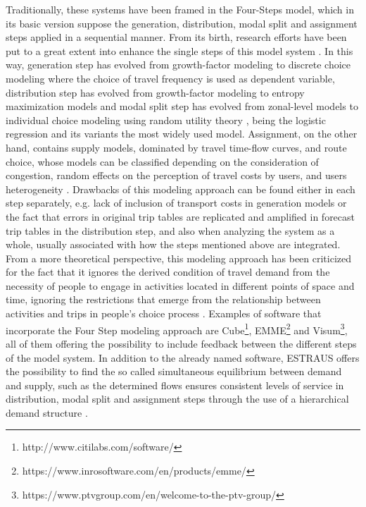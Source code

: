 \documentclass[Journal,letterpaper]{ascelike-new}
\begin{document}
Traditionally, these systems have been framed in the Four-Steps model, which in its basic version suppose the generation, distribution, modal split and assignment steps applied in a sequential manner. From its birth, research efforts have been put to a great extent into enhance the single steps of this model system \citep{Boyce2007}. In this way, generation step has evolved from growth-factor modeling to discrete choice modeling where the choice of travel frequency is used as dependent variable, distribution step has evolved from growth-factor modeling to entropy maximization models and modal split step has evolved from zonal-level models to individual choice modeling using random utility theory \citep{OrtuzarWillumsen2011}, being the logistic regression and its variants the most widely used model. Assignment, on the other hand, contains supply models, dominated by travel time-flow curves, and route choice, whose models can be classified depending on the consideration of congestion, random effects on the perception of travel costs by users, and users heterogeneity \citep{WillumsenHensherButton2008}. Drawbacks of this modeling approach can be found either in each step separately, e.g. lack of inclusion of transport costs in generation models or the fact that errors in original trip tables are replicated and amplified in forecast trip tables in the distribution step, and also when analyzing the system as a whole, usually associated with how the steps mentioned above are integrated. From a more theoretical perspective, this modeling approach has been criticized for the fact that it ignores the derived condition of travel demand from the necessity of people to engage in activities located in different points of space and time, ignoring the restrictions that emerge from the relationship between activities and trips in people's choice process \citep{McNallyAndRindt2008}.
Examples of software that incorporate the Four Step modeling approach are Cube\footnote{http://www.citilabs.com/software/}, EMME\footnote{https://www.inrosoftware.com/en/products/emme/} and Visum\footnote{https://www.ptvgroup.com/en/welcome-to-the-ptv-group/}, all of them offering the possibility to include feedback between the different steps of the model system. In addition to the already named software, ESTRAUS offers the possibility to find the so called simultaneous equilibrium between demand and supply, such as the determined flows ensures consistent levels of service in distribution, modal split and assignment steps through the use of a hierarchical demand structure \citep{ESTRAUS}.
\end{document}
